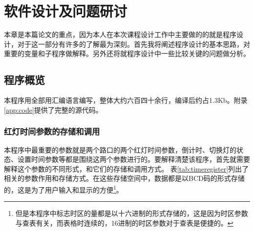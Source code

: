 

\chapter{软件设计及问题研讨}
\label{chap:software}
本章是本篇论文的重点，因为本人在本次课程设计工作中主要做的的就是程序设计，对于这一部分有许多的了解最为深刻。首先我将阐述程序设计的基本思路，对重要的变量和子程序做解释。另外还将就程序设计中一些比较关键的问题做分析。

\section{程序概览}
本程序用全部用汇编语言编写，整体大约六百四十余行，编译后约占1.3Kb。附录\ref{app:code}提供了完整的源代码。
\subsection{红灯时间参数的存储和调用}
	本程序中最重要的参数就是两个路口的两个红灯时间参数，倒计时、切换灯的状态、设置时间参数等都是围绕这两个参数进行的。要解释清楚该程序，首先就需要解释这个参数的不同形式，和它们的存储和调用方式。
	表\ref{tab:timeregister}列出了相关的参数作用和存储方式。在这些存储空间中，数据都是以BCD码的形式存储的，这是为了用户输入和显示的方便\footnote{但是本程序中标志时区的量都是以十六进制的形式存储的，这是因为时区参数与查表有关，而表格时连续的，16进制的时区参数对于查表是便捷的。}。
	
